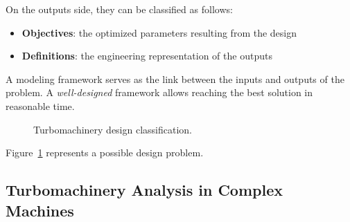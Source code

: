 On the outputs side, they can be classified as follows:
\begin{itemize}
    \item \textbf{Objectives}: the optimized parameters resulting from the design
    \item \textbf{Definitions}: the engineering representation of the outputs
\end{itemize}

A modeling framework serves as the link between the inputs and outputs of the problem.
A \textit{well-designed} framework allows reaching the best solution in reasonable time.

\begin{figure}
    \centering
    
    \caption{Turbomachinery design classification.}
    \label{fig:IO}
\end{figure}

Figure~\ref{fig:IO} represents a possible design problem.

\subsection{Turbomachinery Analysis in Complex Machines}

% 
% 
% 

